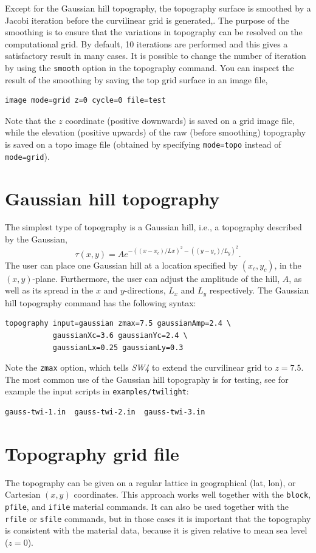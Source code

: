 \documentclass[11pt]{report}
\begin{document}
Except for the Gaussian hill topography, the topography surface is smoothed by a Jacobi iteration
before the curvilinear grid is generated,. The purpose of the smoothing is to ensure that the
variations in topography can be resolved on the computational grid. By default, 10 iterations are
performed and this gives a satisfactory result in many cases. It is possible to change the number of
iteration by using the \verb+smooth+ option in the topography command. You can inspect the result of
the smoothing by saving the top grid surface in an image file,
\begin{verbatim}
image mode=grid z=0 cycle=0 file=test
\end{verbatim}
Note that the $z$ coordinate (positive downwards) is saved on a grid image file, while the elevation
(positive upwards) of the raw (before smoothing) topography is saved on a topo image file (obtained by
specifying \verb+mode=topo+ instead of \verb+mode=grid+).

\section{Gaussian hill topography}\label{sec:topo-gauss-hill}
The simplest type of topography is a Gaussian hill, i.e., a topography described by the Gaussian,
\[
  \tau(x,y)= A e^{-( (x-x_c)/Lx )^2 - ( (y-y_c)/L_y )^2}.
\]
The user can place one Gaussian hill at a location specified by $(x_c,y_c)$, in the $(x,y)$-plane.
Furthermore, the user can adjust the amplitude of the hill, $A$, as well as
its spread in the $x$ and $y$-directions, $L_x$ and $L_y$ respectively. 
The Gaussian hill topography command has the following syntax:
\begin{verbatim}
topography input=gaussian zmax=7.5 gaussianAmp=2.4 \
           gaussianXc=3.6 gaussianYc=2.4 \
           gaussianLx=0.25 gaussianLy=0.3
\end{verbatim}
Note the \verb+zmax+ option, which tells \emph{SW4} to extend the curvilinear grid to $z=7.5$.
The most common use of the Gaussian hill topography is for testing, see for example the input
scripts in \verb+examples/twilight+:
\begin{verbatim}
gauss-twi-1.in  gauss-twi-2.in  gauss-twi-3.in 
\end{verbatim}

\section{Topography grid file}\label{sec:topo-gridfile}
The topography can be given on a regular lattice in geographical (lat, lon), or Cartesian $(x, y)$
coordinates. This approach works well together with the \verb+block+, \verb+pfile+, and \verb+ifile+
material commands. It can also be used together with the \verb+rfile+ or \verb+sfile+ commands, but
in those cases it is important that the topography is consistent with the material data, because it
is given relative to mean sea level ($z=0$).
\end{document}
